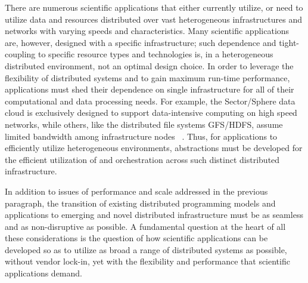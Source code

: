 \documentclass[3p,twocolumn]{elsarticle}
\begin{document}

There are numerous scientific applications that either currently
utilize, or need to utilize data and resources distributed over vast
heterogeneous infrastructures and networks with varying speeds and
characteristics.  Many scientific applications are, however, designed
with a specific infrastructure; such dependence and
tight-coupling to specific resource types and technologies is, in a
heterogeneous distributed environment, not an optimal design choice.
In order to leverage the flexibility of distributed systems and to
gain maximum run-time performance, applications must shed their
dependence on single infrastructure for all of their computational and
data processing needs. For example, the Sector/Sphere data cloud is
exclusively designed to support data-intensive computing on high speed
networks, while others, like the distributed file systems GFS/HDFS,
assume limited bandwidth among infrastructure nodes ~\cite{GFS, HDFS}.
Thus, for applications to efficiently utilize heterogeneous
environments, abstractions must be developed for the efficient
utilization of and orchestration across such distinct distributed
infrastructure.


In addition to issues of performance and scale addressed in the
previous paragraph, the transition of existing distributed programming
models and applications to emerging and novel distributed
infrastructure must be as seamless and as non-disruptive as
possible.  A fundamental question at the heart of all these
considerations is the question of how scientific applications can be
developed so as to utilize as broad a range of distributed systems as
possible, without vendor lock-in, yet with the flexibility and
performance that scientific applications demand.
\end{document}
